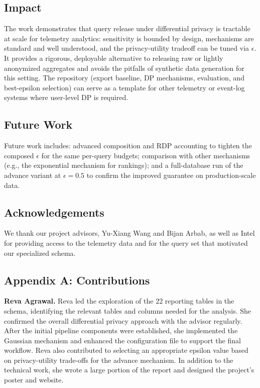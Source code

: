 \documentclass[12pt,letterpaper]{article}
\begin{document}
\subsection{Impact}
The work demonstrates that query release under differential privacy is tractable at scale for telemetry analytics: sensitivity is bounded by design, mechanisms are standard and well understood, and the privacy-utility tradeoff can be tuned via $\epsilon$. It provides a rigorous, deployable alternative to releasing raw or lightly anonymized aggregates and avoids the pitfalls of synthetic data generation for this setting. The repository (export baseline, DP mechanisms, evaluation, and best-epsilon selection) can serve as a template for other telemetry or event-log systems where user-level DP is required.

\subsection{Future Work}
Future work includes: advanced composition and RDP accounting to tighten the composed $\epsilon$ for the same per-query budgets; comparison with other mechanisms (e.g., the exponential mechanism for rankings); and a full-database run of the advance variant at $\epsilon = 0.5$ to confirm the improved guarantee on production-scale data.

\subsection{Acknowledgements}
We thank our project advisors, Yu-Xiang Wang and Bijan Arbab, as well as Intel for providing access to the telemetry data and for the query set that motivated our specialized schema.


\makereference




\clearpage
\makeappendix

\subsection{Appendix A: Contributions}

\textbf{Reva Agrawal.}
Reva led the exploration of the 22 reporting tables in the schema, identifying the relevant tables and columns needed for the analysis. She confirmed the overall differential privacy approach with the advisor regularly. After the initial pipeline components were established, she implemented the Gaussian mechanism and enhanced the configuration file to support the final workflow. Reva also contributed to selecting an appropriate epsilon value based on privacy-utility trade-offs for the advance mechanism. In addition to the technical work, she wrote a large portion of the report and designed the project's poster and website.
\end{document}
